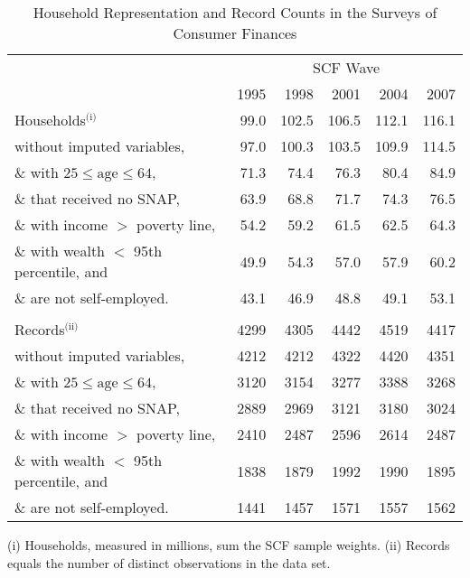 \documentclass[fleqccn,12pt]{article}
\begin{document}
\begin{table} \begin{center}

\begin{tabular}[c]{l*{5}{r}}
 & \multicolumn{5}{c}{SCF Wave} \\
 & 1995 & 1998 & 2001 & 2004 & 2007\\ \hline
%
Households$^{\textrm{(i)}}$&99.0&102.5&106.5&112.1&116.1\\
\hspace{20pt}  without imputed variables,&97.0&100.3&103.5&109.9&114.5\\
 \hspace{20pt} \& with $25\leq\textrm{age}\leq 64$,&71.3&74.4&76.3&80.4&84.9\\
 \hspace{20pt} \& that received no SNAP,&63.9&68.8&71.7&74.3&76.5\\
 \hspace{20pt} \& with income $>$ poverty line,&54.2&59.2&61.5&62.5&64.3\\
 \hspace{20pt} \& with wealth $<$ 95th percentile, and&49.9&54.3&57.0&57.9&60.2\\
 \hspace{20pt} \& are not self-employed.&43.1&46.9&48.8&49.1&53.1\\
\\
%
Records$^{\textrm{(ii)}}$&4299&4305&4442&4519&4417\\
\hspace{20pt}  without imputed variables,&4212&4212&4322&4420&4351\\
 \hspace{20pt} \& with $25\leq\textrm{age}\leq 64$,&3120&3154&3277&3388&3268\\
 \hspace{20pt} \& that received no SNAP,&2889&2969&3121&3180&3024\\
 \hspace{20pt} \& with income $>$ poverty line,&2410&2487&2596&2614&2487\\
 \hspace{20pt} \& with wealth $<$ 95th percentile, and&1838&1879&1992&1990&1895\\
 \hspace{20pt} \& are not self-employed.&1441&1457&1571&1557&1562\\
\end{tabular}
\medskip
\caption{Household Representation and Record Counts in the Surveys of Consumer Finances \label{scfsample}}
\end{center}
\vspace{-1cm}
\noindent \footnotesize
(i) Households, measured in millions, sum the SCF sample weights. (ii) Records equals the number of distinct observations in the data set. 
\normalsize
\end{table}
\end{document}
